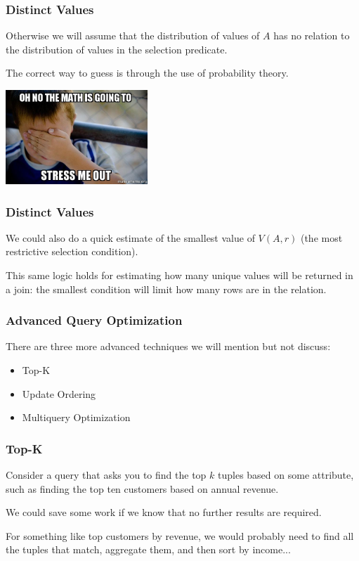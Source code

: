 \begin{frame}
\frametitle{Distinct Values}

Otherwise we will assume that the distribution of values of $A$ has no relation to the distribution of values in the selection predicate. 

The correct way to guess is through the use of probability theory. 

\begin{center}
	\includegraphics[width=0.4\textwidth]{images/ohnomath.jpg}
\end{center}

\end{frame}


\begin{frame}
\frametitle{Distinct Values}
We could also do a quick estimate of the smallest value of $V(A, r)$ (the most restrictive selection condition). 

This same logic holds for estimating how many unique values will be returned in a join: the smallest condition will limit how many rows are in the relation.

\end{frame}


\begin{frame}
\frametitle{Advanced Query Optimization}

There are three more advanced techniques we will mention but not discuss:

\begin{itemize}
	\item Top-K
	\item Update Ordering
	\item Multiquery Optimization
\end{itemize}


\end{frame}

\begin{frame}
\frametitle{Top-K}

Consider a query that asks you to find the top $k$ tuples based on some attribute, such as finding the top ten customers based on annual revenue. 

We could save some work if we know that no further results are required.

For something like top customers by revenue, we would probably need to find all the tuples that match, aggregate them, and then sort by income...

\end{frame}


